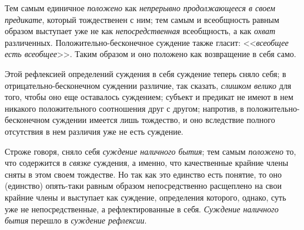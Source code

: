 Тем самым единичное
{\em положено} как
{\em непрерывно продолжающееся в своем
предикате}, который тождественен с ним; тем самым и
всеобщность равным образом выступает уже не как
{\em непосредственная}
всеобщность, а как
{\em охват} различенных.
Положительно-бесконечное суждение также гласит:
<<{\em всеобщее есть всеобщее}>>.
Таким образом и оно положено как возвращение в себя само.

Этой рефлексией определений суждения в себя суждение теперь
сняло себя; в отрицательно-бесконечном суждении различие, так сказать,
{\em слишком велико} для
того, чтобы оно еще оставалось суждением; субъект и предикат не имеют в нем
никакого положительного соотношения друг с другом; напротив, в
положительно-бесконечном суждении имеется лишь тождество, и оно вследствие
полного отсутствия в нем различия уже не есть суждение.

Строже говоря, сняло себя
{\em суждение наличного бытия};
тем самым {\em положено}
то, что содержится в
{\em связке} суждения, а
именно, что качественные крайние члены сняты в этом своем тождестве. Но так
как это единство есть понятие, то оно (единство) опять-таки равным образом
непосредственно расщеплено на свои крайние члены и выступает как суждение,
определения которого, однако, суть уже не непосредственные, а
рефлектированные в себя. {\em Суждение
наличного бытия} перешло в
{\em суждение рефлексии}.

